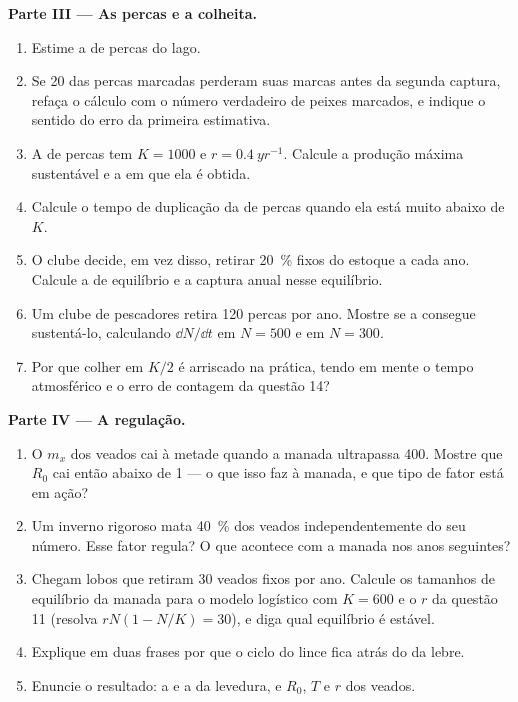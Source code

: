 \begin{problem}
\medskip
\noindent\textbf{Parte III --- As percas e a colheita.}
\begin{enumerate}[resume]
  \item Estime a  de percas do lago.
  \item Se 20 das percas marcadas perderam suas marcas antes da
        segunda captura, refaça o cálculo com o número verdadeiro de
        peixes marcados, e indique o sentido do erro da primeira
        estimativa.
  \item A  de percas tem $K = 1000$ e $r = \qty{0.4}{yr^{-1}}$.
        Calcule a produção máxima sustentável e a  em que ela
        é obtida.
  \item Calcule o tempo de duplicação da  de percas quando
        ela está muito abaixo de $K$.
  \item O clube decide, em vez disso, retirar \qty{20}{\%} fixos do
        estoque a cada ano. Calcule a  de equilíbrio e a
        captura anual nesse equilíbrio.
  \item Um clube de pescadores retira 120 percas por ano. Mostre se a
         consegue sustentá-lo, calculando $\dd N/\dd t$ em $N =
        500$ e em $N = 300$.
  \item Por que colher em $K/2$ é arriscado na prática, tendo em mente
        o tempo atmosférico e o erro de contagem da questão 14?
\end{enumerate}

\medskip
\noindent\textbf{Parte IV --- A regulação.}
\begin{enumerate}[resume]
  \item O $m_x$ dos veados cai à metade quando a manada ultrapassa
        400. Mostre que $R_0$ cai então abaixo de 1 --- o que isso faz
        à manada, e que tipo de fator está em ação?
  \item Um inverno rigoroso mata \qty{40}{\%} dos veados
        independentemente do seu número. Esse fator regula? O que
        acontece com a manada nos anos seguintes?
  \item Chegam lobos que retiram 30 veados fixos por ano. Calcule os
        tamanhos de equilíbrio da manada para o modelo logístico com
        $K = 600$ e o $r$ da questão 11 (resolva $rN(1 - N/K) = 30$), e
        diga qual equilíbrio é estável.
  \item Explique em duas frases por que o ciclo do lince fica atrás do
        da lebre.
  \item Enuncie o resultado: a  e a  da levedura, e $R_0$, $T$ e $r$ dos
        veados.
\end{enumerate}
\end{problem}
